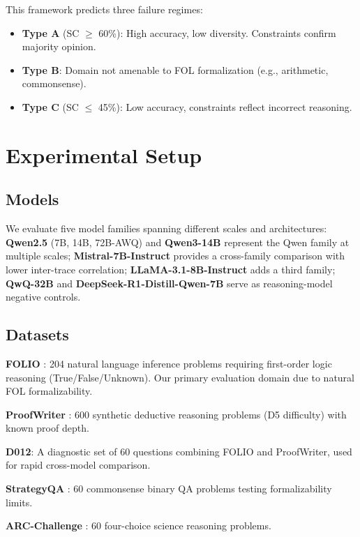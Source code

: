\documentclass[11pt,a4paper]{article}
\begin{document}
This framework predicts three failure regimes:
\begin{itemize}
\item \textbf{Type A} (SC $\geq$ 60\%): High accuracy, low diversity. Constraints confirm majority opinion.
\item \textbf{Type B}: Domain not amenable to FOL formalization (e.g., arithmetic, commonsense).
\item \textbf{Type C} (SC $\leq$ 45\%): Low accuracy, constraints reflect incorrect reasoning.
\end{itemize}

\section{Experimental Setup}

\subsection{Models}

We evaluate five model families spanning different scales and architectures: \textbf{Qwen2.5} (7B, 14B, 72B-AWQ) and \textbf{Qwen3-14B} represent the Qwen family at multiple scales; \textbf{Mistral-7B-Instruct} provides a cross-family comparison with lower inter-trace correlation; \textbf{LLaMA-3.1-8B-Instruct} adds a third family; \textbf{QwQ-32B} and \textbf{DeepSeek-R1-Distill-Qwen-7B} serve as reasoning-model negative controls.

\subsection{Datasets}

\textbf{FOLIO} \cite{han2022folio}: 204 natural language inference problems requiring first-order logic reasoning (True/False/Unknown). Our primary evaluation domain due to natural FOL formalizability.

\textbf{ProofWriter} \cite{tafjord2021proofwriter}: 600 synthetic deductive reasoning problems (D5 difficulty) with known proof depth.

\textbf{D012}: A diagnostic set of 60 questions combining FOLIO and ProofWriter, used for rapid cross-model comparison.

\textbf{StrategyQA} \cite{geva2021strategyqa}: 60 commonsense binary QA problems testing formalizability limits.

\textbf{ARC-Challenge} \cite{clark2018arc}: 60 four-choice science reasoning problems.
\end{document}
